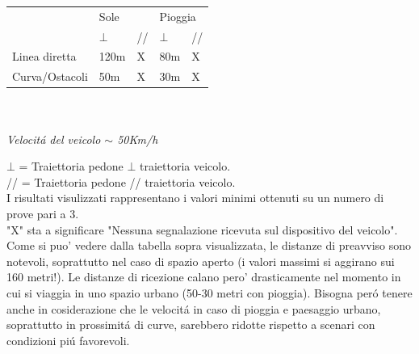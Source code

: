 \documentclass[conference]{IEEEtran}
\begin{document}
\begin{center}


	\begin{tabular}{lll|ll}
		\hline
		& \multicolumn{2}{l|}{Sole} & \multicolumn{2}{l}{Pioggia} \\
		& $\bot$        & //        & $\bot$         & //         \\ \hline
		Linea diretta                     & 120m             & X         & 80m              & X          \\ \hline
		\multicolumn{1}{c}{Curva/Ostacoli} & 50m             & X        & 30m             & X         \\ \hline
	\end{tabular}
\\~\\
\textit{Velocit\'a del veicolo $\sim$ 50Km/h}
\\

\end{center}
$\bot$ = Traiettoria pedone $\bot$ traiettoria veicolo.
\\
// = Traiettoria pedone // traiettoria veicolo.
\\
I risultati visulizzati rappresentano i valori  minimi ottenuti su un numero di prove pari a 3.\\
"X" sta a significare "Nessuna segnalazione ricevuta sul dispositivo del veicolo". 
Come si puo' vedere dalla tabella sopra visualizzata, le distanze di preavviso sono notevoli, soprattutto nel caso di spazio aperto (i valori massimi si aggirano sui 160 metri!).
Le distanze di ricezione calano pero' drasticamente nel momento in cui si viaggia in uno spazio urbano (50-30 metri con pioggia). Bisogna per\'o tenere anche in cosiderazione che le velocit\'a in caso di pioggia e paesaggio urbano, soprattutto in prossimit\'a di curve, sarebbero ridotte rispetto a scenari con condizioni pi\'u favorevoli.
\end{document}
